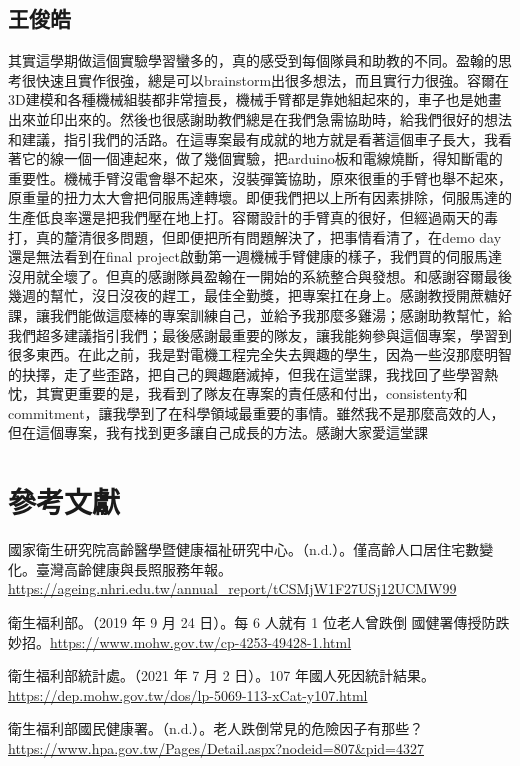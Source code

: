 \documentclass[12pt]{article}
\begin{document}
\subsection*{王俊皓}
其實這學期做這個實驗學習蠻多的，真的感受到每個隊員和助教的不同。盈翰的思考很快速且實作很強，總是可以brainstorm出很多想法，而且實行力很強。容爾在3D建模和各種機械組裝都非常擅長，機械手臂都是靠她組起來的，車子也是她畫出來並印出來的。然後也很感謝助教們總是在我們急需協助時，給我們很好的想法和建議，指引我們的活路。在這專案最有成就的地方就是看著這個車子長大，我看著它的線一個一個連起來，做了幾個實驗，把arduino板和電線燒斷，得知斷電的重要性。機械手臂沒電會舉不起來，沒裝彈簧協助，原來很重的手臂也舉不起來，原重量的扭力太大會把伺服馬達轉壞。即便我們把以上所有因素排除，伺服馬達的生產低良率還是把我們壓在地上打。容爾設計的手臂真的很好，但經過兩天的毒打，真的釐清很多問題，但即便把所有問題解決了，把事情看清了，在demo day還是無法看到在final project啟動第一週機械手臂健康的樣子，我們買的伺服馬達沒用就全壞了。但真的感謝隊員盈翰在一開始的系統整合與發想。和感謝容爾最後幾週的幫忙，沒日沒夜的趕工，最佳全勤獎，把專案扛在身上。感謝教授開蔗糖好課，讓我們能做這麼棒的專案訓練自己，並給予我那麼多雞湯；感謝助教幫忙，給我們超多建議指引我們；最後感謝最重要的隊友，讓我能夠參與這個專案，學習到很多東西。在此之前，我是對電機工程完全失去興趣的學生，因為一些沒那麼明智的抉擇，走了些歪路，把自己的興趣磨滅掉，但我在這堂課，我找回了些學習熱忱，其實更重要的是，我看到了隊友在專案的責任感和付出，consistenty和commitment，讓我學到了在科學領域最重要的事情。雖然我不是那麼高效的人，但在這個專案，我有找到更多讓自己成長的方法。感謝大家愛這堂課

\vspace{4em}

\clearpage
\section*{參考文獻}
國家衛生研究院高齡醫學暨健康福祉研究中心。（n.d.）。僅高齡人口居住宅數變化。臺灣高齡健康與長照服務年報。\url{https://ageing.nhri.edu.tw/annual_report/tCSMjW1F27USj12UCMW99}

衛生福利部。（2019 年 9 月 24 日）。每 6 人就有 1 位老人曾跌倒 國健署傳授防跌妙招。\url{https://www.mohw.gov.tw/cp-4253-49428-1.html}

衛生福利部統計處。（2021 年 7 月 2 日）。107 年國人死因統計結果。\url{https://dep.mohw.gov.tw/dos/lp-5069-113-xCat-y107.html}

衛生福利部國民健康署。（n.d.）。老人跌倒常見的危險因子有那些？\url{https://www.hpa.gov.tw/Pages/Detail.aspx?nodeid=807&pid=4327}
\end{document}
